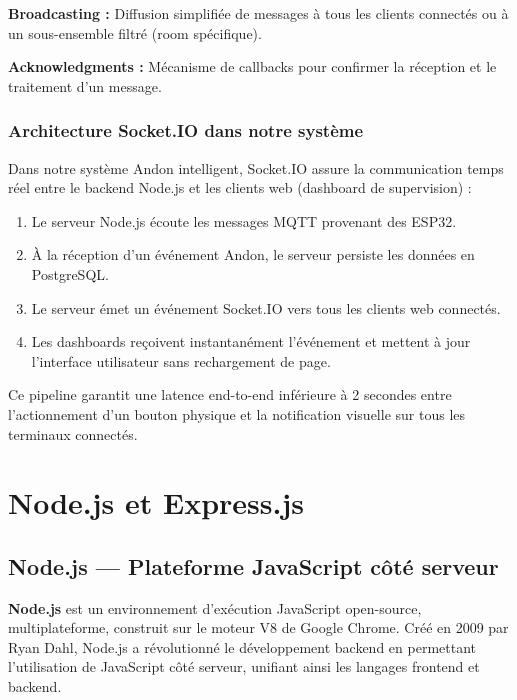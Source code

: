 \textbf{Broadcasting :} Diffusion simplifiée de messages à tous les clients connectés ou à un sous-ensemble filtré (room spécifique).

\textbf{Acknowledgments :} Mécanisme de callbacks pour confirmer la réception et le traitement d'un message.


\subsubsection{Architecture Socket.IO dans notre système}

Dans notre système Andon intelligent, Socket.IO assure la communication temps réel entre le backend Node.js et les clients web (dashboard de supervision) :

\begin{enumerate}
    \item Le serveur Node.js écoute les messages MQTT provenant des ESP32.
    \item À la réception d'un événement Andon, le serveur persiste les données en PostgreSQL.
    \item Le serveur émet un événement Socket.IO vers tous les clients web connectés.
    \item Les dashboards reçoivent instantanément l'événement et mettent à jour l'interface utilisateur sans rechargement de page.
\end{enumerate}

Ce pipeline garantit une latence end-to-end inférieure à 2 secondes entre l'actionnement d'un bouton physique et la notification visuelle sur tous les terminaux connectés.


\section{Node.js et Express.js}

\subsection{Node.js — Plateforme JavaScript côté serveur}

\textbf{Node.js} est un environnement d'exécution JavaScript open-source, multiplateforme, construit sur le moteur V8 de Google Chrome. Créé en 2009 par Ryan Dahl, Node.js a révolutionné le développement backend en permettant l'utilisation de JavaScript côté serveur, unifiant ainsi les langages frontend et backend.

